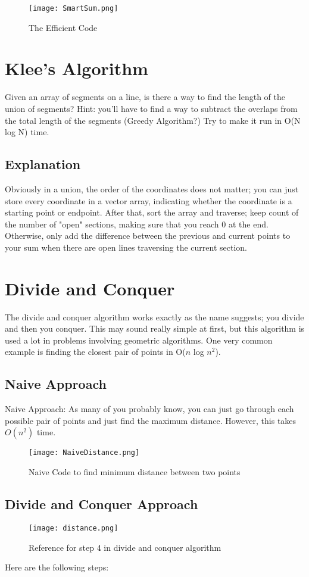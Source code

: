 \documentclass{article}
\begin{document}
\begin{figure}[htp]
    \centering
    \texttt{[image: SmartSum.png]}
    \caption{The Efficient Code}
\end{figure}

\section{Klee's Algorithm}

Given an array of segments on a line, is there a way to find the length of the union of segments?
Hint: you'll have to find a way to subtract the overlaps from the total length of the segments (Greedy Algorithm?) Try to make it run in O(N log N) time.

\subsection{Explanation}

Obviously in a union, the order of the coordinates does not matter; you can just store every coordinate in a vector array, indicating whether the coordinate is a starting point or endpoint. After that, sort the array and traverse; keep count of the number of "open" sections, making sure that you reach 0 at the end. Otherwise, only add the difference between the previous and current points to your sum when there are open lines traversing the current section.

\section{Divide and Conquer}
The divide and conquer algorithm works exactly as the name suggests; you divide and then you conquer. This may sound really simple at first, but this algorithm is used a lot in problems involving geometric algorithms. One very common example is finding the closest pair of points in O($n$ log $n^2$). 
\subsection{Naive Approach}
Naive Approach: As many of you probably know, you can just go through each possible pair of points and just find the maximum distance. However, this takes $O(n^2)$ time.
\begin{figure}[htp]
    \centering
    \texttt{[image: NaiveDistance.png]}
    \caption{Naive Code to find minimum distance between two points}
\end{figure}
\subsection{Divide and Conquer Approach}
    \begin{figure}
    \centering
    \texttt{[image: distance.png]}
    \caption{Reference for step 4 in divide and conquer algorithm}
    \end{figure}
Here are the following steps:
\end{document}
